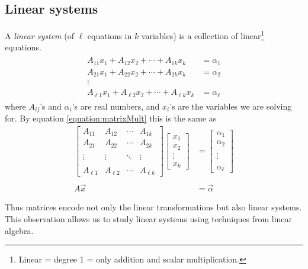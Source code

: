 \subsection{Linear systems}
A \emph{linear system} (of $\ell$ equations in $k$ variables) is a collection of linear\footnote{Linear = degree 1 = only addition and scalar multiplication.} equations.
\begin{align}
  \label{equation:generalLinearSystem}
  \begin{split}
    A_{11} x_1  + A_{12} x_2 + \cdots + A_{1k} x_k &= \alpha_1 \\
    A_{21} x_1  + A_{22} x_2 + \cdots + A_{2k} x_k &= \alpha_2 \\
    \vdots \\
    A_{\ell 1} x_1 + A_{\ell 2} x_2+ \cdots + A_{\ell k} x_k &= \alpha_\ell
  \end{split}
\end{align}
where $A_{ij}$'s and $\alpha_i$'s are real numbers, and $x_i$'s are the variables we are solving for.
By equation \eqref{equation:matrixMult} this is the same as
\begin{align*}
  \begin{bmatrix}
    A_{11} & A_{12} & \cdots & A_{1k} \\
    A_{21} & A_{22} & \cdots & A_{2k} \\\\
    \vdots & \vdots & \ddots & \vdots \\\\
    A_{\ell 1} & A_{\ell 2} & \cdots & A_{\ell k}
  \end{bmatrix}
  \begin{bmatrix} x_1 \\ x_2 \\ \vdots \\ x_k \end{bmatrix}
    &=
  \begin{bmatrix} \alpha_1 \\ \alpha_2 \\\\ \vdots \\\\ \alpha_\ell \end{bmatrix}
    \\\\
  A \vec{x}
  &= \vec{\alpha}
\end{align*}

Thus matrices encode not only the linear transformations but also linear systems. This observation allows us to study linear systems using techniques from linear algebra.


